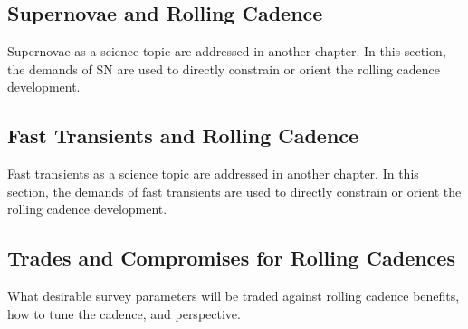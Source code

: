 \subsection{ Supernovae and Rolling Cadence}
\label{sec:keyword} %


Supernovae as a science topic are addressed in another chapter.
In this section, the demands of SN are used to directly constrain or
orient the rolling cadence development.


\subsection{ Fast Transients and Rolling Cadence}
\label{sec:keyword} %


Fast transients as a science topic are addressed in another chapter.
In this section, the demands of fast transients are used to directly constrain or
orient the rolling cadence development.

\subsection{ Trades and Compromises for Rolling Cadences}
\label{sec:keyword} %


What desirable survey parameters will be traded against rolling cadence benefits, how to tune the cadence, and 
perspective.


% 
% 
% 
